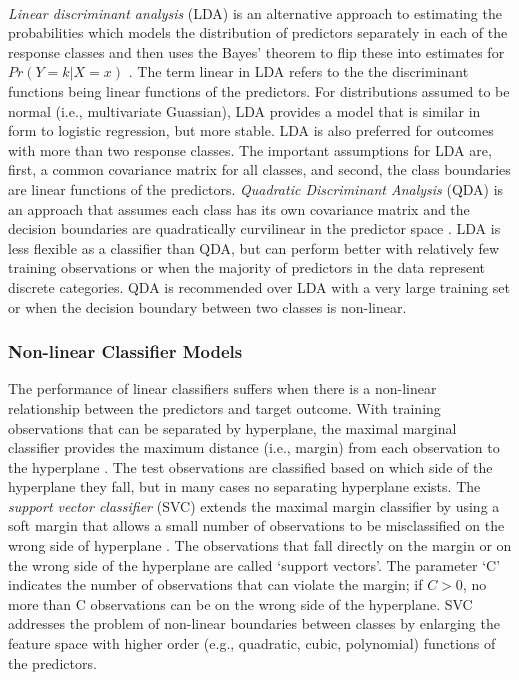 \\\documentclass[sigconf]{acmart}
\begin{document}
\emph{Linear discriminant analysis} (LDA) is an alternative approach to 
estimating the probabilities which models the distribution of predictors 
separately in each of the response classes and then uses the Bayes' theorem 
to flip these into estimates for $Pr(Y=k | X=x)$ \cite{james13}. The term 
linear in LDA refers to the the discriminant functions being linear functions 
of the predictors. For distributions assumed to be normal (i.e., multivariate 
Guassian), LDA provides a model that is similar in form to logistic regression, 
but more stable. LDA is also preferred for outcomes with more than two response 
classes. The important assumptions for LDA are, first, a common covariance 
matrix for all classes, and second, the class boundaries are linear functions 
of the predictors. \emph{Quadratic Discriminant Analysis} (QDA) is an approach 
that assumes each class has its own covariance matrix and the decision 
boundaries are quadratically curvilinear in the predictor space \cite{kuhn13}. 
LDA is less flexible as a classifier than QDA, but can perform better with 
relatively few training observations or when the majority of predictors in the 
data represent discrete categories. QDA is recommended over LDA with a very 
large training set or when the decision boundary between two classes is 
non-linear. 


\subsubsection{Non-linear Classifier Models}

The performance of linear classifiers suffers when there is a non-linear 
relationship between the predictors and target outcome. With training
observations that can be separated by hyperplane, the maximal marginal 
classifier provides the maximum distance (i.e., margin) from each observation
to the hyperplane \cite{james13}. The test observations are classified based 
on which side of the hyperplane they fall, but in many cases no separating 
hyperplane exists. The \emph{support vector classifier} (SVC) extends the 
maximal margin classifier by using a soft margin that allows a small number 
of observations to be misclassified on the wrong side of hyperplane 
\cite{kuhn13, cortes95}. The observations that fall directly on the margin or 
on the wrong side of the hyperplane are called `support vectors'. The parameter 
`C' indicates the number of observations that can violate the margin; if $C>0$, 
no more than C observations can be on the wrong side of the hyperplane. 
SVC addresses the problem of non-linear boundaries between classes by 
enlarging the feature space with higher order (e.g., quadratic, cubic, 
polynomial) functions of the predictors. 
\end{document}
